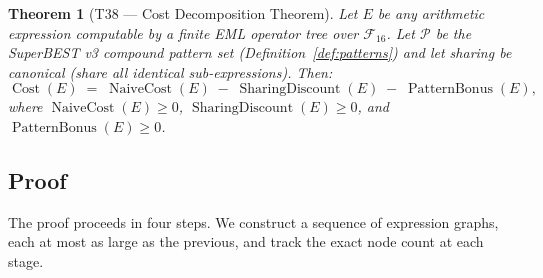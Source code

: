 \documentclass[12pt,a4paper]{article}
\newtheorem{theorem}{Theorem}[section]
\theoremstyle{definition}
\newcommand{\Cost}{\operatorname{Cost}}
\newcommand{\NC}{\operatorname{NaiveCost}}
\newcommand{\SD}{\operatorname{SharingDiscount}}
\newcommand{\PB}{\operatorname{PatternBonus}}
\begin{document}
\begin{theorem}[T38 --- Cost Decomposition Theorem]
\label{thm:T38}
Let $E$ be any arithmetic expression computable by a finite EML operator tree
over $\mathcal{F}_{16}$.  Let $\mathcal{P}$ be the SuperBEST v3 compound
pattern set (Definition~\ref{def:patterns}) and let sharing be canonical
(share all identical sub-expressions).  Then:
\begin{equation}
  \boxed{\Cost(E) \;=\; \NC(E) \;-\; \SD(E) \;-\; \PB(E),}
\label{eq:T38}
\end{equation}
where $\NC(E) \geq 0$, $\SD(E) \geq 0$, and $\PB(E) \geq 0$.
\end{theorem}

\subsection{Proof}

The proof proceeds in four steps.  We construct a sequence of expression
graphs, each at most as large as the previous, and track the exact node count
at each stage.
\end{document}
